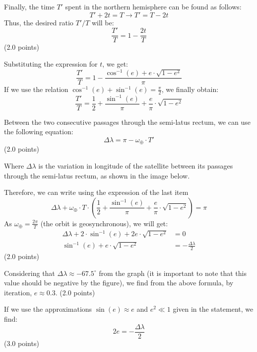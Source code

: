 \begin{description}
  Finally, the time $T'$ spent in the northern hemisphere can be found as
  follows:
  \[
    T' + 2t = T \rightarrow T' = T - 2t
  \]
  Thus, the desired ratio $T'/T$ will be:
  \[
    \frac{T'}{T} = 1 - \frac{2t}{T}
  \]
  \hfill(2.0 points)

  Substituting the expression for $t$, we get:
  \[
    \frac{T'}{T} = 1 - \frac{\cos^{-1}(e) + e\cdot\sqrt{1 - e^2}}{\pi}
  \]
  If we use the relation $\cos^{-1}(e) + \sin^{-1}(e) = \frac{\pi}{2}$, we
  finally obtain:
  \[
    \boxed{\frac{T'}{T} = \frac{1}{2} + \frac{\sin^{-1}(e)}{\pi}
      + \frac{e}{\pi}\cdot\sqrt{1 - e^2}}
  \]

\item[(h)] Between the two consecutive passages through the semi-latus rectum,
  we can use the following equation:
  \[
    \Delta\lambda = \pi - \omega_\oplus\cdot T'
  \]
  \hfill(2.0 points)

  Where $\Delta\lambda$ is the variation in longitude of the satellite between
  its passages through the semi-latus rectum, as shown in the image below.


  Therefore, we can write using the expression of the last item
  \[
    \Delta\lambda + \omega_\oplus\cdot T\cdot
      \left(\frac{1}{2} + \frac{\sin^{-1}(e)}{\pi}
      + \frac{e}{\pi}\cdot\sqrt{1 - e^2}\right) = \pi
  \]
  As $\omega_\oplus = \frac{2\pi}{T}$ (the orbit is geosynchronous), we will
  get:
  \begin{align*}
    \Delta\lambda + 2\cdot\sin^{-1}(e) + 2e\cdot\sqrt{1 - e^2} &= 0 \\
    \sin^{-1}(e) + e\cdot\sqrt{1 - e^2} &= -\frac{\Delta\lambda}{2}
  \end{align*}
  \hfill(2.0 points)

  Considering that $\Delta\lambda \approx -67.5^\circ$ from the graph (it is
  important to note that this value should be negative by the figure), we find
  from the above formula, by iteration, $\boxed{e \approx 0.3}$.
  \hfill(2.0 points)

  If we use the approximations $\sin(e) \approx e$ and $e^2 \ll 1$ given in
  the statement, we find:
  \[
    2e = -\frac{\Delta\lambda}{2}
  \]
  \hfill(3.0 points)


\end{description}
